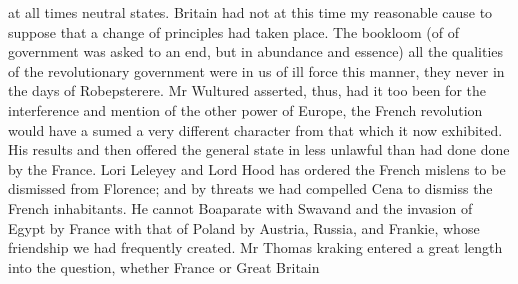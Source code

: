 \documentclass{article}
\begin{document}
at all times neutral states. Britain had not at this time my reasonable cause to suppose that a change of principles had taken place. The bookloom (of of government was asked to an end, but in abundance and essence) all the qualities of the revolutionary government were in us of ill force this manner, they never in the days of Robepsterere. Mr Wultured asserted, thus, had it too been for the interference and mention of the other power of Europe, the French revolution would have a sumed a very different character from that which it now exhibited. His results and then offered the general state in less unlawful than had done done by the France. Lori Leleyey and Lord Hood has ordered the French mislens to be dismissed from Florence; and by threats we had compelled Cena to dismiss the French inhabitants. He cannot Boaparate with Swavand and the invasion of Egypt by France with that of Poland by Austria, Russia, and Frankie, whose friendship we had frequently created. Mr Thomas kraking entered a great length into the question, whether France or Great Britain
\end{document}
